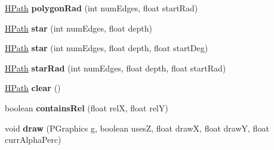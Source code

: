 \begin{DoxyCompactItemize}
\item 
\hypertarget{classhype_1_1drawable_1_1_h_path_a2e50e660109761776241d9c41e8fb132}{\hyperlink{classhype_1_1drawable_1_1_h_path}{H\-Path} {\bfseries polygon\-Rad} (int num\-Edges, float start\-Rad)}\label{classhype_1_1drawable_1_1_h_path_a2e50e660109761776241d9c41e8fb132}

\item 
\hypertarget{classhype_1_1drawable_1_1_h_path_a80d11cfd16ae84a07aa52b7d59e301ce}{\hyperlink{classhype_1_1drawable_1_1_h_path}{H\-Path} {\bfseries star} (int num\-Edges, float depth)}\label{classhype_1_1drawable_1_1_h_path_a80d11cfd16ae84a07aa52b7d59e301ce}

\item 
\hypertarget{classhype_1_1drawable_1_1_h_path_a7331d86a61b558eb840ac66da5a23f4e}{\hyperlink{classhype_1_1drawable_1_1_h_path}{H\-Path} {\bfseries star} (int num\-Edges, float depth, float start\-Deg)}\label{classhype_1_1drawable_1_1_h_path_a7331d86a61b558eb840ac66da5a23f4e}

\item 
\hypertarget{classhype_1_1drawable_1_1_h_path_acaae9c01f4b330740a387f6e55b82b7b}{\hyperlink{classhype_1_1drawable_1_1_h_path}{H\-Path} {\bfseries star\-Rad} (int num\-Edges, float depth, float start\-Rad)}\label{classhype_1_1drawable_1_1_h_path_acaae9c01f4b330740a387f6e55b82b7b}

\item 
\hypertarget{classhype_1_1drawable_1_1_h_path_aae95fc174db2c006e5cb7f2df99b5232}{\hyperlink{classhype_1_1drawable_1_1_h_path}{H\-Path} {\bfseries clear} ()}\label{classhype_1_1drawable_1_1_h_path_aae95fc174db2c006e5cb7f2df99b5232}

\item 
\hypertarget{classhype_1_1drawable_1_1_h_path_a2f3932e890ba712db9935def871ffc5d}{boolean {\bfseries contains\-Rel} (float rel\-X, float rel\-Y)}\label{classhype_1_1drawable_1_1_h_path_a2f3932e890ba712db9935def871ffc5d}

\item 
\hypertarget{classhype_1_1drawable_1_1_h_path_af4d2d92b1c30aa6f9f7e91ab162364c0}{void {\bfseries draw} (P\-Graphics g, boolean uses\-Z, float draw\-X, float draw\-Y, float curr\-Alpha\-Perc)}\label{classhype_1_1drawable_1_1_h_path_af4d2d92b1c30aa6f9f7e91ab162364c0}

\end{DoxyCompactItemize}
